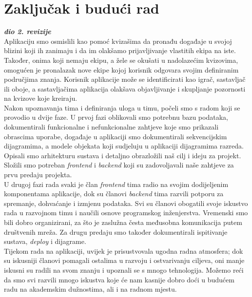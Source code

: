 \chapter{Zaključak i budući rad}
		
		\textbf{\textit{dio 2. revizije}}\\
		

		
		Aplikaciju smo osmislili kao pomoć kvizašima da pronađu događaje u svojoj blizini koji ih zanimaju i da im olakšamo prijavljivanje vlastitih ekipa na iste.
Također, onima koji nemaju ekipu, a žele se okušati u nadolazećim kvizovima, omogućen je pronalazak nove ekipe kojoj korisnik odgovara svojim definiranim područjima znanja. Korisnik aplikacije može se identificirati kao igrač, sastavljač ili oboje, a sastavljačima aplikacija olakšava objavljivanje i skupljanje pozornosti na kvizove koje kreiraju. \\
Nakon upoznavanja tima i definiranja uloga u timu, počeli smo s radom koji se provodio u dvije faze. U prvoj fazi oblikovali smo potrebnu bazu podataka, dokumentirali funkcionalne i nefunkcionalne zahtjeve koje smo prikazali obrascima uporabe, događaje u aplikaciji smo dokumentirali sekvencijskim dijagramima, a modele objekata koji sudjeluju u aplikaciji dijagramima razreda. Opisali smo arhitekturu sustava i detaljno obrazložili naš cilj i ideju za projekt. Složili smo potreban \textit{frontend} i \textit{backend} koji su zadovoljavali naše zahtjeve za prvu predaju projekta. \\
U drugoj fazi rada svaki je član \textit{frontend} tima radio na svojim dodijeljenim komponentama aplikacije, dok su članovi \textit{backend} tima razvili potporu za spremanje, dohvaćanje i izmjenu podataka. Svi su članovi obogatili svoje iskustvo rada u razvojnom timu i naučili osnove programskog inženjerstva. Vremenski smo bili dobro organizirani, za što je zaslužna česta međusobna komunikacija putem društvenih mreža. Za drugu predaju smo također dokumentirali ispitivanje sustava, \textit{deploy} i dijagrame.\\
 Tijekom rada na aplikaciji, uvijek je prisustvovala ugodna radna atmosfera; dok su iskusniji članovi pomagali ostalima u razvoju i ostvarivanju ciljeva, oni manje iskusni su radili na svom znanju i upoznali se s mnogo tehnologija. Možemo reći da smo svi razvili mnogo iskustva koje će nam kasnije dobro doći u budućem radu na akademskim dužnostima, ali i na radnom mjestu.\\


		
		\eject 